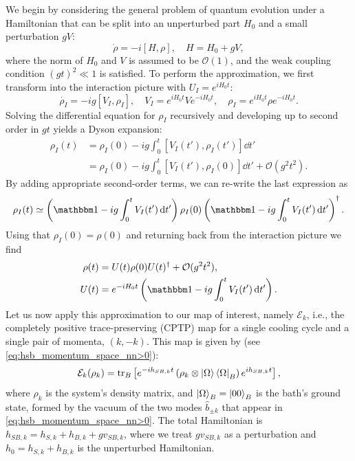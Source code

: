 We begin by considering the general problem of quantum evolution under a Hamiltonian that can be split into an unperturbed part $H_0$ and a small perturbation $gV$:
\begin{equation}
    \dot{\rho}=-i[H,\rho],\quad H=H_0+gV,
\end{equation}
where the norm of $H_0$ and $V$ is assumed to be $\mathcal{O}(1)$, and the weak coupling condition $(gt)^2 \ll 1$ is satisfied. To perform the approximation, we first transform into the interaction picture with $U_I=e^{i H_0t}$:
\begin{equation}
    \dot{\rho_I}=-ig[V_I,\rho_I],\quad V_I=e^{i H_0t}Ve^{-iH_0t},\quad \rho_I=e^{i H_0t}\rho e^{-iH_0t}.
\end{equation}
Solving the differential equation for $\rho_I$ recursively and developing up to second order in $gt$ yields a Dyson expansion:
\begin{align}
    \rho_I(t) &=\rho_I(0)-ig\int_0^t[V_I(t'),\rho_I(t')]\dd t'\nonumber\\
              &=\rho_I(0)-ig\int_0^t[V_I(t'),\rho_I(0)]\dd t'+\mathcal{O}(g^2t^2).
\end{align}
By adding appropriate second-order terms, we can re-write the last expression as
\begin{equation}
    \rho_I(t)\simeq\left(\Id-ig\int_0^t V_I(t')\dd t'\right)\rho_I(0)\left(\Id - ig\int_0^t V_I(t')\dd t'\right)^\dag.
\end{equation}
Using that $\rho_I(0)=\rho(0)$ and returning back from the interaction picture we find
\begin{align}
    \rho(t) &= U(t)\rho(0)U(t)^\dag+\mathcal{O}(g^2t^2),\\
    U(t)    &= e^{-iH_0t}\left(\Id-ig\int_0^t V_I(t')\dd t'\right).
    \label{eq:Dyson_expansion}
\end{align}
Let us now apply this approximation to our map of interest, namely $\mathcal{E}_k$, i.e., the completely positive trace-preserving (CPTP) map for a single cooling cycle and a single pair of momenta, $(k,-k)$. This map is given by (see \cref{eq:hsb_momentum_space_nn>0}):
\begin{equation}
    \mathcal{E}_k(\rho_k) = \operatorname{tr}_B \left[ e^{-i h_{SB,k} t} \left( \rho_k \otimes \ket{\Omega}\bra{\Omega}_B \right) e^{i h_{SB,k} t} \right],
    \label{eq:CPTP_map}
\end{equation}
where $\rho_k$ is the system's density matrix, and $\ket{\Omega}_B=\ket{00}_B$ is the bath's ground state, formed by the vacuum of the two modes $\hat{b}_{\pm k}$ that appear in \cref{eq:hsb_momentum_space_nn>0}. The total Hamiltonian is $h_{SB,k} = h_{S,k} + h_{B,k} + gv_{SB,k}$, where we treat $gv_{SB,k}$ as a perturbation and $h_0 = h_{S,k} + h_{B,k}$ is the unperturbed Hamiltonian.

